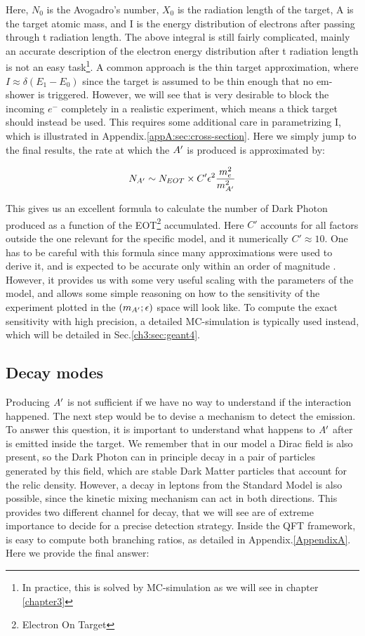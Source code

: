 Here, $N_0$ is the Avogadro's number, $X_0$ is the radiation length of the target, A is the target atomic mass, and I is the energy distribution of electrons after passing through t radiation length. The above integral is still fairly complicated, mainly an accurate description of the electron energy distribution after t radiation length is not an easy task\footnote{In practice, this is solved by MC-simulation as we will see in chapter \ref{chapter3}}. A common approach is the thin target approximation, where $I \approx \delta (E_1 - E_0)$ since the target is assumed to be thin enough that no em-shower is triggered. However, we will see that is very desirable to block the incoming $e^-$ completely in a realistic experiment, which means a thick target should instead be used. This requires some additional care in parametrizing I, which is illustrated in Appendix.\ref{appA:sec:cross-section}. Here we simply jump to the final results, the rate at which the $A'$ is produced is approximated by:

\begin{equation}
  \label{eq:dm-rate}
  N_{A'} \sim N_{EOT} \times C' \epsilon^2 \frac{m_e^2}{m^2_{A'}}
\end{equation}

This gives us an excellent formula to calculate the number of Dark Photon produced as a function of the EOT\footnote{Electron On Target} accumulated. Here $C'$ accounts for all factors outside the one relevant for the specific model, and it numerically $C' \approx 10$. One has to be careful with this formula since many approximations were used to derive it, and is expected to be accurate only within an order of magnitude \cite{jdb}. However, it provides us with some very useful scaling with the parameters of the model, and allows some simple reasoning on how to the sensitivity of the experiment plotted in the $(m_{A'};\epsilon)$ space will look like. To compute the exact sensitivity with high precision, a detailed MC-simulation is typically used instead, which will be detailed in Sec.\ref{ch3:sec:geant4}.

\subsection{Decay modes}
\label{ch1:sec:dm-decay}

Producing $A'$ is not sufficient if we have no way to understand if the interaction happened. The next step would be to devise a mechanism to detect the emission. To answer this question, it is important to understand what happens to $A'$ after is emitted inside the target. We remember that in our model a Dirac field is also present, so the Dark Photon can in principle decay in a pair of particles generated by this field, which are stable Dark Matter particles that account for the relic density. However, a decay in leptons from the Standard Model is also possible, since the kinetic mixing mechanism can act in both directions. This provides two different channel for decay, that we will see are of extreme importance to decide for a precise detection strategy. Inside the QFT framework, is easy to compute both branching ratios, as detailed in Appendix.\ref{AppendixA}. Here we provide the final answer:

